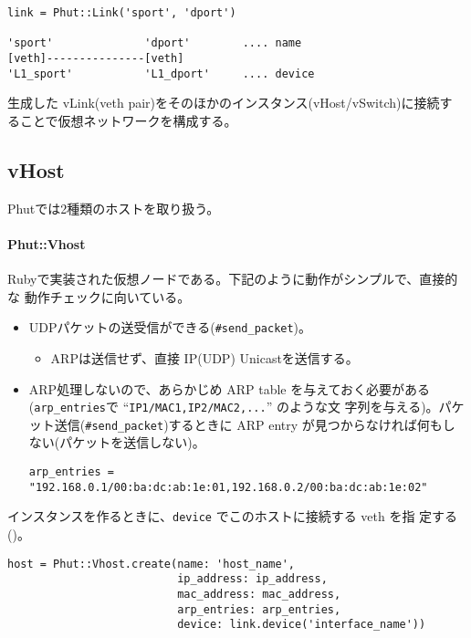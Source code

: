 \begin{textbox}
\begin{verbatim}
link = Phut::Link('sport', 'dport')

'sport'              'dport'        .... name
[veth]---------------[veth]
'L1_sport'           'L1_dport'     .... device
\end{verbatim}
\end{textbox}

生成した vLink(veth pair)をそのほかのインスタンス(vHost/vSwitch)に接続す
ることで仮想ネットワークを構成する。

\subsection{vHost}
Phutでは2種類のホストを取り扱う。

\paragraph{Phut::Vhost}

Rubyで実装された仮想ノードである。下記のように動作がシンプルで、直接的な
動作チェックに向いている。
\begin{itemize}
 \item UDPパケットの送受信ができる(\verb|#send_packet|)。
       \begin{itemize}
        \item ARPは送信せず、直接 IP(UDP) Unicastを送信する。
       \end{itemize}
 \item ARP処理しないので、あらかじめ ARP table を与えておく必要がある
       (\verb|arp_entries|で ``\verb|IP1/MAC1,IP2/MAC2,...|'' のような文
       字列を与える)。パケット送信(\verb|#send_packet|)するときに ARP
       entry が見つからなければ何もしない(パケットを送信しない)。
\begin{lstlisting}[title=\code{arp\_entries}の例]
arp_entries = "192.168.0.1/00:ba:dc:ab:1e:01,192.168.0.2/00:ba:dc:ab:1e:02"
\end{lstlisting}
\end{itemize}


インスタンスを作るときに、\verb|device| でこのホストに接続する veth を指
定する()。
\begin{lstlisting}[caption=Phut::Vhostインスタンスの作成,label=lst:create-vhost-instance]
host = Phut::Vhost.create(name: 'host_name',
                          ip_address: ip_address,
                          mac_address: mac_address,
                          arp_entries: arp_entries,
                          device: link.device('interface_name'))
\end{lstlisting}

